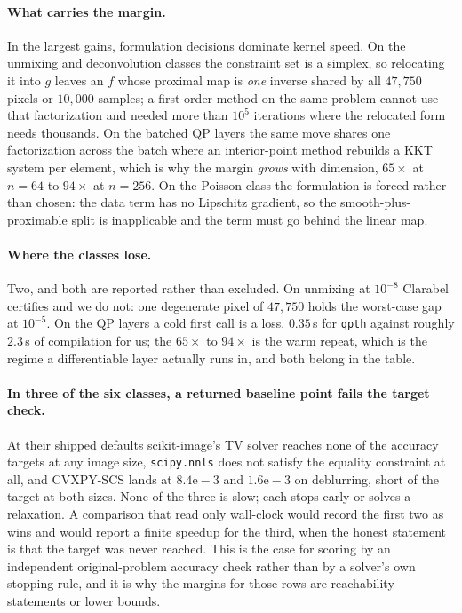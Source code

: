 \paragraph{What carries the margin.} In the largest gains, formulation
decisions dominate kernel speed. On the unmixing and deconvolution classes
the constraint set is a simplex, so relocating it into $g$ leaves an $f$ whose
proximal map is \emph{one} inverse shared by all $47{,}750$ pixels or
$10{,}000$ samples; a first-order method on the same problem cannot use that
factorization and needed more than $10^5$ iterations where the relocated form
needs thousands. On the batched QP layers the same move shares one
factorization across the batch where an interior-point method rebuilds a KKT
system per element, which is why the margin \emph{grows} with dimension,
$65\times$ at $n=64$ to $94\times$ at $n=256$. On the Poisson class the
formulation is forced rather than chosen: the data term has no Lipschitz
gradient, so the smooth-plus-proximable split is inapplicable and the term
must go behind the linear map.

\paragraph{Where the classes lose.} Two, and both are reported rather than
excluded. On unmixing at $10^{-8}$ Clarabel certifies and we do not: one
degenerate pixel of $47{,}750$ holds the worst-case gap at $10^{-5}$. On the
QP layers a cold first call is a loss, $0.35$\,s for \texttt{qpth} against
roughly $2.3$\,s of compilation for us; the $65\times$ to $94\times$ is the
warm repeat, which is the regime a differentiable layer actually runs in, and
both belong in the table.

\paragraph{In three of the six classes, a returned baseline point fails the target check.} At
their shipped defaults scikit-image's TV solver reaches none of the accuracy
targets at any image size, \texttt{scipy.nnls} does not satisfy the equality
constraint at all, and CVXPY-SCS lands at $8.4\mathrm{e}{-}3$ and
$1.6\mathrm{e}{-}3$ on deblurring, short of the target at both sizes. None of
the three is slow; each stops early or solves a relaxation. A comparison that
read only wall-clock would record the first two as wins and would report a
finite speedup for the third, when the honest statement is that the target was
never reached. This is the case for scoring by an independent original-problem
accuracy check rather
than by a solver's own stopping rule, and it is why the margins for those rows
are reachability statements or lower bounds.

